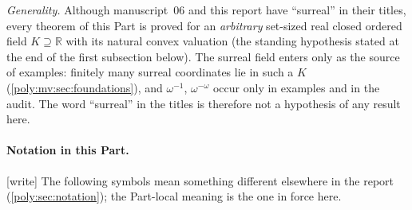 \documentclass[11pt,a4paper]{article}
\numberwithin{equation}{section}
\theoremstyle{plain}
\newcommand{\wtag}{\textup{[write]}}%
\newcommand{\R}{\mathbb R}
\begin{document}
\emph{Generality.} Although manuscript~06 and this report have ``surreal'' in
their titles, every theorem of this Part is proved for an \emph{arbitrary}
set-sized real closed ordered field $K\supseteq\R$ with its natural convex
valuation (the standing hypothesis stated at the end of the first subsection
below). The surreal field enters only as the source of examples: finitely many
surreal coordinates lie in such a $K$ (\cref{poly:mv:sec:foundations}), and
$\omega^{-1}$, $\omega^{-\omega}$ occur only in examples and in the audit. The
word ``surreal'' in the titles is therefore not a hypothesis of any result
here.

\paragraph{Notation in this Part.}\wtag{} The following symbols mean something
different elsewhere in the report (\cref{poly:sec:notation}); the Part-local
meaning is the one in force here.
\end{document}

